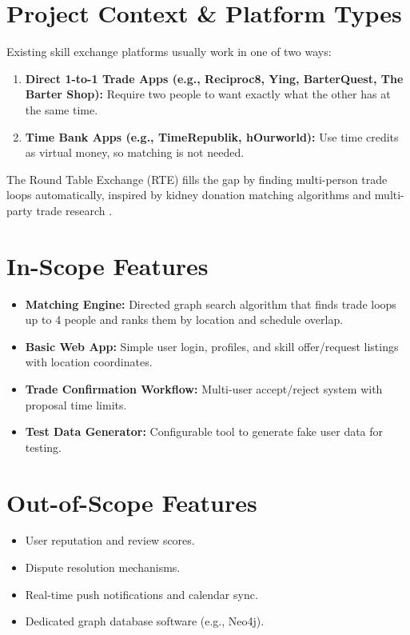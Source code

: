 \section{Project Context \& Platform Types}

Existing skill exchange platforms usually work in one of two ways:
\begin{enumerate}
    \item \textbf{Direct 1-to-1 Trade Apps (e.g., Reciproc8, Ying, BarterQuest, The Barter Shop):} Require two people to want exactly what the other has at the same time.
    \item \textbf{Time Bank Apps (e.g., TimeRepublik, hOurworld):} Use time credits as virtual money, so matching is not needed.
\end{enumerate}

The Round Table Exchange (RTE) fills the gap by finding multi-person trade loops automatically, inspired by kidney donation matching algorithms \cite{abraham2007clearing, roth2004kidney} and multi-party trade research \cite{bartermultiway2010, patent2008}.

\section{In-Scope Features}

\begin{itemize}
    \item \textbf{Matching Engine:} Directed graph search algorithm that finds trade loops up to 4 people and ranks them by location and schedule overlap.
    \item \textbf{Basic Web App:} Simple user login, profiles, and skill offer/request listings with location coordinates.
    \item \textbf{Trade Confirmation Workflow:} Multi-user accept/reject system with proposal time limits.
    \item \textbf{Test Data Generator:} Configurable tool to generate fake user data for testing.
\end{itemize}

\section{Out-of-Scope Features}

\begin{itemize}
    \item User reputation and review scores.
    \item Dispute resolution mechanisms.
    \item Real-time push notifications and calendar sync.
    \item Dedicated graph database software (e.g., Neo4j).
\end{itemize}